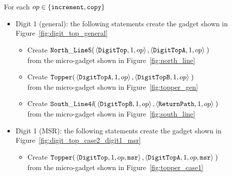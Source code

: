 For each $op \in \{ {\tt increment, copy } \}$
    \begin{itemize}

        \item Digit 1 (general): the following statements create the gadget shown in Figure~\ref{fig:digit_top_general}
        \begin{itemize}
            \item Create
            $\begin{aligned}[t]
                {\tt North\_Line5}(& \left \langle {\tt DigitTop},  1, op \right\rangle,
                                     \left \langle {\tt DigitTopA}, 1, op \right\rangle \;)
            \end{aligned}$\\from the micro-gadget shown in Figure~\ref{fig:north_line}

            \item Create
            $\begin{aligned}[t]
                {\tt Topper}(& \left \langle {\tt DigitTopA}, 1, op \right\rangle,
                               \left \langle {\tt DigitTopB}, 1, op \right\rangle \;)
            \end{aligned}$\\from the micro-gadget shown in Figure~\ref{fig:topper_gen}

            \item Create
            $\begin{aligned}[t]
                {\tt South\_Line4\textit{l}}(& \left\langle {\tt DigitTopB}, 1, op \right\rangle,
                                               \left\langle {\tt ReturnPath},     1, op \right\rangle \;)
            \end{aligned}$\\from the micro-gadget shown in Figure~\ref{fig:south_line}
        \end{itemize}
        \vspace{1cm}

        \item Digit 1 (MSR): the following statements create the gadget shown in Figure~\ref{fig:digit_top_case2_digit1_msr}
        \begin{itemize}
            \item Create
            $\begin{aligned}[t]
                {\tt Topper}(& \left\langle {\tt DigitTop},  1, op, {\tt msr} \right\rangle,
                               \left\langle {\tt DigitTopA}, 1, op, {\tt msr} \right\rangle \;)
            \end{aligned}$ \\ from the micro-gadget shown in Figure~\ref{fig:topper_case1}



\end{itemize}
\end{itemize}
